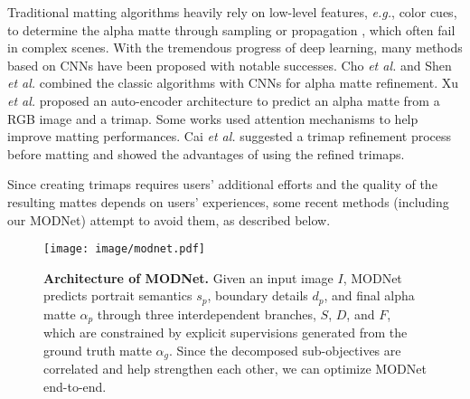 \documentclass[letterpaper]{article} \usepackage{aaai22}  \usepackage{times}  \usepackage{helvet}  \usepackage{courier}  \usepackage[hyphens]{url}  \usepackage{graphicx} \urlstyle{rm} \def\UrlFont{\rm}  \usepackage{natbib}  \usepackage{caption} \usepackage{booktabs}
\begin{document}
Traditional matting algorithms heavily rely on low-level features, {\it e.g.}, color cues, to determine the alpha matte through sampling \cite{sampling_chuang, sampling_feng, sampling_gastal, sampling_he, sampling_johnson, sampling_karacan, sampling_ruzon,yang2018active} or propagation \cite{prop_aksoy2, prop_aksoy, prop_bai, prop_chen, prop_grady, prop_levin, prop_levin2, prop_sun}, which often fail in complex scenes. With the tremendous progress of deep learning, many methods based on CNNs have been proposed with notable successes. Cho {\it et al.} \cite{NIMUDCNN} and Shen {\it et al.} \cite{DAPM} combined the classic algorithms with CNNs for alpha matte refinement. Xu {\it et al.} \cite{DIM} proposed an auto-encoder architecture to predict an alpha matte from a RGB image and a trimap. Some works \cite{GCA, IndexMatter} used attention mechanisms to help improve matting performances. 
Cai {\it et al.} \cite{AdaMatting} suggested a trimap refinement process before matting and showed the advantages of using the refined trimaps. 

Since creating trimaps requires users' additional efforts and the quality of the resulting mattes depends on users' experiences, some recent methods (including our MODNet) attempt to avoid them, as described below.




\begin{figure*}[t]
\begin{center}
   \texttt{[image: image/modnet.pdf]}
\end{center}
   \caption{\textbf{Architecture of MODNet.}  
    Given an input image $I$, MODNet predicts portrait semantics $s_p$, boundary details $d_p$, and final alpha matte $\alpha_p$ through three interdependent branches, $S$, $D$, and $F$, which are constrained by explicit supervisions generated from the ground truth matte $\alpha_g$. 
    Since the decomposed sub-objectives are correlated and help strengthen each other, we can optimize MODNet end-to-end.
   }
\label{fig:modnet}
\end{figure*}
\end{document}
